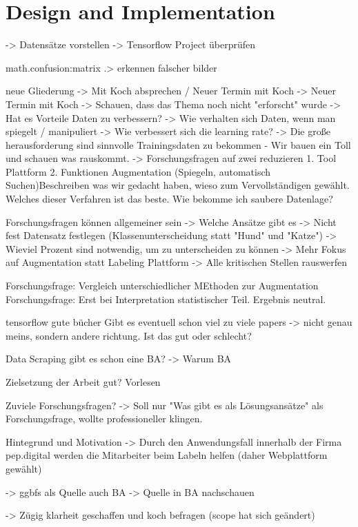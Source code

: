\chapter{Design and Implementation}
-> Datensätze vorstellen
-> Tensorflow Project überprüfen

math.confusion:matrix .> erkennen falscher bilder

neue  Gliederung -> Mit Koch absprechen / Neuer Termin mit Koch
-> Neuer Termin mit Koch 
-> Schauen, dass das Thema noch nicht "erforscht" wurde
-> Hat es Vorteile Daten zu verbessern?
-> Wie verhalten sich Daten, wenn man spiegelt / manipuliert
-> Wie verbessert sich die learning rate?
-> Die große herausforderung sind sinnvolle Trainingsdaten zu bekommen - Wir bauen ein Toll und schauen was rauskommt.
-> Forschungsfragen auf zwei reduzieren
1. Tool Plattform 2. Funktionen Augmentation (Spiegeln, automatisch Suchen)Beschreiben was wir gedacht haben, wieso zum Vervollständigen gewählt. Welches dieser Verfahren ist das beste. Wie bekomme ich saubere Datenlage? 

Forschungsfragen können allgemeiner sein
-> Welche Ansätze gibt es
-> Nicht fest Datensatz festlegen (Klassenunterscheidung statt "Hund" und "Katze") -> Wieviel Prozent sind notwendig, um zu unterscheiden zu können
-> Mehr Fokus auf Augmentation statt Labeling Plattform
-> Alle kritischen Stellen rauswerfen

Forschungsfrage: Vergleich unterschiedlicher MEthoden zur Augmentation
Forschungsfrage: Erst bei Interpretation statistischer Teil. Ergebnis neutral.  

tensorflow gute bücher
Gibt es eventuell schon viel zu viele papers -> nicht genau meins, sondern andere richtung. Ist das gut oder schlecht?

Data Scraping gibt es schon eine BA? -> Warum BA

Zielsetzung der Arbeit gut? Vorlesen

Zuviele Forschungsfragen? -> Soll nur "Was gibt es als Lösungsansätze" als Forschungsfrage, wollte professioneller klingen.

Hintegrund und Motivation -> Durch den Anwendungsfall innerhalb der Firma pep.digital werden die Mitarbeiter beim Labeln helfen (daher Webplattform gewählt)

-> ggbfs als Quelle auch BA -> Quelle in BA nachschauen

-> Zügig klarheit geschaffen und koch befragen (scope hat sich geändert)

